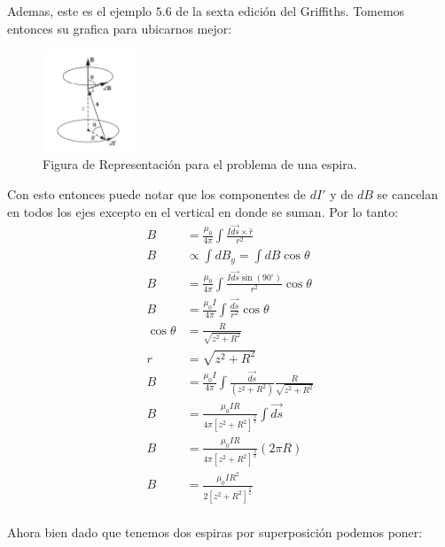 \documentclass{report}
\begin{document}

Ademas, este es el ejemplo $5.6$ de la sexta edición del Griffiths. Tomemos entonces su grafica para ubicarnos mejor:

\begin{figure}[h]
	\begin{center}
		\includegraphics[width=0.25\textwidth]{img/book_5_21.png}
	\end{center}
	\caption{Figura de Representación para el problema de una espira.}\label{fig:Fig_5_21}
\end{figure}

Con esto entonces puede notar que los componentes de $d I'$ y de $d B$ se cancelan en todos los ejes excepto en el vertical en donde se suman. Por lo tanto:
\begin{align*}
	B &= \frac{\mu_0}{4\pi} \int \frac{I \vec{d s} \times \hat{r}}{r^2}\\
	B &\propto \int d B_y = \int dB \cos\theta\\
	B &= \frac{\mu_0}{4\pi} \int \frac{I \vec{d s} \sin\left(90^{\circ}\right)}{r^2}\cos\theta\\
	B &= \frac{\mu_0 I}{4\pi} \int \frac{\vec{d s}}{r^2}\cos\theta\\
	\cos\theta &= \frac{R}{\sqrt{z^2 + R^2}}\\
	r &= \sqrt{z^2 + R^2}\\
	B &= \frac{\mu_0 I}{4\pi} \int \frac{\vec{d s}}{\left(z^2 + R^2\right)}\frac{R}{\sqrt{z^2 + R^2}}\\
	B &= \frac{\mu_0 I R}{4\pi \left[ z^2 + R^2\right]^{\frac{3}{2}}} \int \vec{d s}\\
	B &= \frac{\mu_0 I R}{4\pi \left[ z^2 + R^2\right]^{\frac{3}{2}}} \left( 2\pi R\right)\\
	B &= \frac{\mu_0 I R^2}{2\left[ z^2 + R^2\right]^{\frac{3}{2}}}\\
\end{align*}

Ahora bien dado que tenemos dos espiras por superposición podemos poner:
\end{document}
